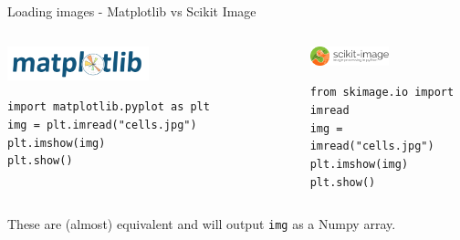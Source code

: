 \documentclass[9pt, aspectratio=169]{beamer}
\begin{document}
\begin{frame}
    {Loading images - Matplotlib vs Scikit Image}

    \begin{columns}
        \begin{column}{0.5\textwidth}
            \begin{center}
                \includegraphics[width=0.5\textwidth]{matplotlib_logo.png}
            \end{center}
            \begin{codebox}
                \texttt{import matplotlib.pyplot as plt\\
                    img = plt.imread("cells.jpg")\\
                    plt.imshow(img)\\
                    plt.show()
                }
            \end{codebox}
        \end{column}
        \pause
        \begin{column}{0.5\textwidth}
            \begin{center}
                \includegraphics[width=0.5\textwidth]{skimage_logo.png}
            \end{center}
            \begin{codebox}
                \texttt{from skimage.io import imread\\
                    img = imread("cells.jpg")\\
                    plt.imshow(img)\\
                    plt.show()
                }
            \end{codebox}
        \end{column}
    \end{columns}
    \pause
    \centering
    These are (almost) equivalent and will output \texttt{img} as a Numpy array.
\end{frame}
\end{document}
